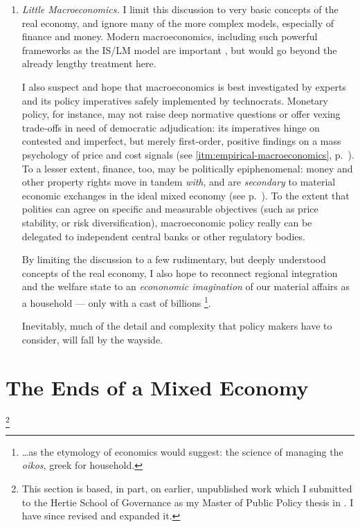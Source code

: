 \begin{enumerate}
	\item \label{itm:little-macroeconomics} \emph{Little Macroeconomics.} 
		I limit this discussion to very basic concepts of the real economy, and ignore many of the more complex models, especially of finance and money. 
		Modern macroeconomics, including such powerful frameworks as the IS/LM model are important \citep[originally][]{Hicks1937}, but would go beyond the already lengthy treatment here. 
	
		I also suspect and hope that macroeconomics is best investigated by experts and its policy imperatives safely implemented by technocrats. 
		Monetary policy, for instance, may not raise deep normative questions or offer vexing trade-offs in need of democratic adjudication: its imperatives hinge on contested and imperfect, but merely first-order, positive findings on a mass psychology of price and cost signals (see \autoref{itm:empirical-macroeconomics}, p.~\pageref{itm:empirical-macroeconomics}).
		To a lesser extent, finance, too, may be politically epiphenomenal: money and other property rights move in tandem \emph{with}, and are \emph{secondary} to material economic exchanges in the ideal mixed economy (see p.~\pageref{itm:epiphenomenal-finance}). 
		To the extent that polities can agree on specific and measurable objectives (such as price stability, or risk diversification), macroeconomic policy really can be delegated to independent central banks or other regulatory bodies.
	
		By limiting the discussion to a few rudimentary, but deeply understood concepts of the real economy, I also hope to reconnect regional integration and the welfare state to an \emph{econonomic imagination} \citep[paraphrasing][]{Mills-1959-aa} of our material affairs as a household --- only with a cast of billions
		\footnote{
			\ldots as the etymology of economics would suggest: the science of managing the \emph{oikos}, greek for household.
		}. 
	
		Inevitably, much of the detail and complexity that policy makers have to consider, will fall by the wayside. 
\end{enumerate}

\section[Ends]{The Ends of a Mixed Economy} \label{sec:ends}

\footnote{\label{fn:also-in-mpp} 
	This section is based, in part, on earlier, unpublished work which I submitted to the Hertie School of Governance as my Master of Public Policy thesis in \citep{Held2010a}. 
	I have since revised and expanded it.
}

